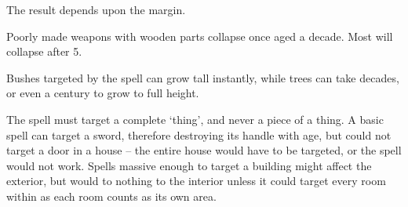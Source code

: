 \begin{multicols}{2}
\begin{figure}
\end{figure}

The result depends upon the margin.

Poorly made weapons with wooden parts collapse once aged a decade.
Most will collapse after 5.

Bushes targeted by the spell can grow tall instantly, while trees can take decades, or even a century to grow to full height.

The spell must target a complete `thing', and never a piece of a thing.
A basic spell can target a sword, therefore destroying its handle with age, but could not target a door in a house -- the entire house would have to be targeted, or the spell would not work.
Spells massive enough to target a building might affect the exterior, but would to nothing to the interior unless it could target every room within as each room counts as its own area.

\end{multicols}


